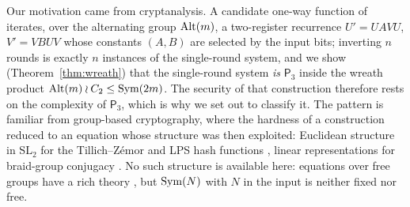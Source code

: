 \documentclass[preprint,12pt]{elsarticle}
\theoremstyle{definition}\newtheorem{defi}[thm]{Definition}\newtheorem{prob}[thm]{Problem}\newtheorem{obs}[thm]{Observation}
\theoremstyle{remark}\newtheorem{rem}[thm]{Remark}
\newcommand{\Pthree}{\mathsf{P}_3}\newcommand{\Conj}[1]{\mathsf{Conj}_{#1}}\newcommand{\Dzero}{\Conj{3}}\newcommand{\TR}{T_{\mathcal R}}
\begin{document}
Our motivation came from cryptanalysis. A candidate one-way function of \cite{filardo2026cpwi} iterates, over the alternating group $\operatorname{Alt}(m)$, a two-register recurrence $U'=UAVU$, $V'=VBUV$ whose constants $(A,B)$ are selected by the input bits; inverting $n$ rounds is exactly $n$ instances of the single-round system, and we show (Theorem~\ref{thm:wreath}) that the single-round system \emph{is} $\Pthree$ inside the wreath product $\operatorname{Alt}(m)\wr C_2\le\operatorname{Sym}(2m)$. The security of that construction therefore rests on the complexity of $\Pthree$, which is why we set out to classify it. The pattern is familiar from group-based cryptography, where the hardness of a construction reduced to an equation whose structure was then exploited: Euclidean structure in $\mathrm{SL}_2$ for the Tillich--Z\'emor and LPS hash functions \cite{tillich1994,petit2008,grassl2011}, linear representations for braid-group conjugacy \cite{cheon2003,myasnikov2005,tsaban2015}. No such structure is available here: equations over free groups have a rich theory \cite{lyndon1960}, but $\operatorname{Sym}(N)$ with $N$ in the input is neither fixed nor free.
\end{document}
